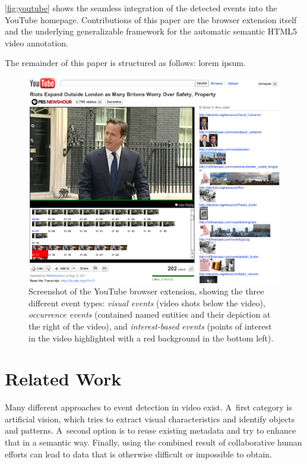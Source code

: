 \documentclass[runningheads,a4paper]{llncs}
\begin{document}
\autoref{fig:youtube} shows the seamless integration of the detected events into the YouTube homepage. Contributions of this paper are the browser extension itself and the underlying generalizable framework for the automatic semantic HTML5 video annotation.

The remainder of this paper is structured as follows: lorem ipsum.

\begin{figure}[htb!]
\begin{center}
   \includegraphics[width=0.8\linewidth]{./resources/youtube}
\end{center}
   \caption{Screenshot of the YouTube browser extension, showing the three different event types: \emph{visual events} (video shots below the video), \emph{occurrence events} (contained named entities and their depiction at the right of the video), and \emph{interest-based events} (points of interest in the video highlighted with a red background in the bottom left).}
\label{fig:youtube}
\end{figure}


\section{Related Work} \label{sec:related-work}
Many different approaches to event detection in video exist.
A~first category is artificial vision, which tries to extract visual characteristics and identify objects and patterns.
A~second option is to reuse existing metadata and try to enhance that in a semantic way.
Finally, using the combined result of collaborative human efforts can lead to data that is otherwise difficult or impossible to obtain.
\end{document}

